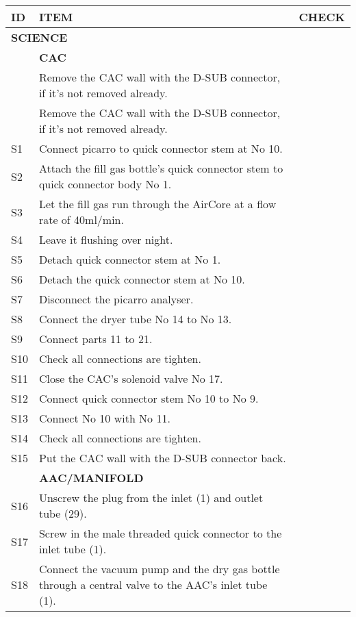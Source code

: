 


\begin{longtable} {|m{}|m{}|m{}|}
\hline
\textbf{ID} & \textbf{ITEM} & \textbf{CHECK} \\
\hline
\multicolumn{2}{|l|}{ \textbf{SCIENCE} } & \\
\hline
& \textbf{CAC} & \\
\hline
& Remove the CAC wall with the D-SUB connector, if it's not removed already. & \\ \hline
& Remove the CAC wall with the D-SUB connector, if it's not removed already. & \\ \hline
S1 & Connect picarro to quick connector stem at No 10. & \\ \hline
S2 & Attach the fill gas bottle's quick connector stem to quick connector body No 1. & \\ \hline
S3 & Let the fill gas run through the AirCore at a flow rate of 40ml/min. & \\ \hline
S4 & Leave it flushing over night. & \\ \hline
S5 & Detach quick connector stem at No 1. & \\ \hline
S6 & Detach the quick connector stem at No 10. & \\ \hline
S7 & Disconnect the picarro analyser. & \\ \hline
S8 & Connect the dryer tube No 14 to No 13. & \\ \hline
S9 & Connect parts 11 to 21. & \\ \hline
S10 & Check all connections are tighten. & \\ \hline
S11 & Close the CAC's solenoid valve No 17. & \\ \hline
S12 & Connect quick connector stem No 10 to No 9. & \\ \hline
S13 & Connect No 10 with No 11. & \\ \hline
S14 & Check all connections are tighten. & \\ \hline
S15 & Put the CAC wall with the D-SUB connector back. & \\ \hline
& \textbf{AAC/MANIFOLD} & \\ \hline
S16 & Unscrew the plug from the inlet (1) and outlet tube (29). & \\ \hline
S17 & Screw in the male threaded quick connector to the inlet tube (1). & \\ \hline
S18 & Connect the vacuum pump and the dry gas bottle through a central valve to the AAC's inlet tube (1). & \\ \hline

\end{longtable}
